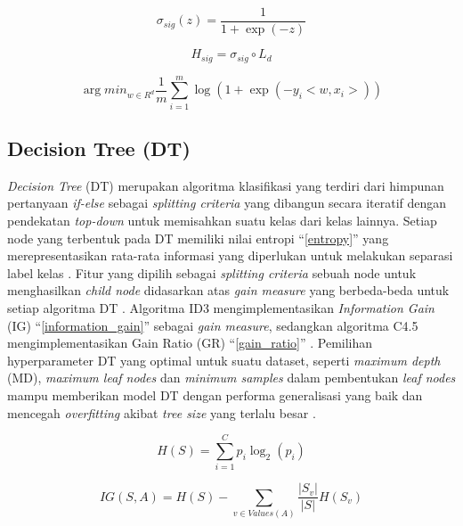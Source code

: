 \documentclass[conference]{IEEEtran}
\begin{document}
\begin{equation}
    \sigma_{sig}(z) = \frac{1}{1+ \exp(-z)} \label{sigmoid}
\end{equation}

\begin{equation}
    H_{sig} = \sigma_{sig} \circ L_d \label{logreg_hypothesis}
\end{equation}

\begin{equation}
    \arg min_{w \in R^d} \frac{1}{m} \sum_{i=1}^{m}\log(1+\exp(-y_i<w, x_i>)) \label{logreg}
\end{equation}

\subsection{Decision Tree (DT)}

\textit{Decision Tree} (DT) merupakan algoritma klasifikasi yang terdiri dari himpunan pertanyaan \textit{if-else} sebagai \textit{splitting criteria} yang dibangun secara iteratif 
dengan pendekatan \textit{top-down} untuk memisahkan suatu kelas dari kelas lainnya. Setiap node yang terbentuk pada DT memiliki nilai entropi ``\eqref{entropy}'' yang merepresentasikan 
rata-rata informasi yang diperlukan untuk melakukan separasi label kelas \cite{b15}. Fitur yang dipilih sebagai \textit{splitting criteria} sebuah node untuk menghasilkan \textit{child node} 
didasarkan atas \textit{gain measure} yang berbeda-beda untuk setiap algoritma DT \cite{b4}. Algoritma ID3 mengimplementasikan \textit{Information Gain} (IG) ``\eqref{information_gain}'' sebagai \textit{gain measure}, sedangkan algoritma C4.5 
mengimplementasikan Gain Ratio (GR) ``\eqref{gain_ratio}'' \cite{b16}. Pemilihan hyperparameter DT yang optimal untuk suatu dataset, seperti \textit{maximum depth} (MD), \textit{maximum leaf nodes} dan \textit{minimum samples} 
dalam pembentukan \textit{leaf nodes} mampu memberikan model DT dengan performa generalisasi yang baik dan mencegah \textit{overfitting} akibat \textit{tree size} yang terlalu besar \cite{b17}.

\begin{equation}
    H(S) = \sum_{i=1}^{C} p_i \log_2(p_i) \label{entropy}
\end{equation}

\begin{equation}
    IG(S, A) = H(S) - \sum_{v \in Values(A)} \frac{|S_v|}{|S|} H(S_v) \label{information_gain}
\end{equation}
\end{document}
